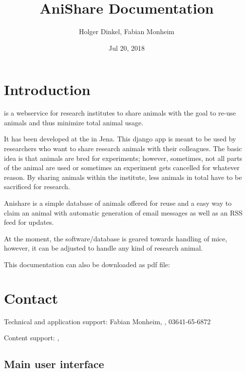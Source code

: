 \documentclass[letterpaper,10pt,openany,oneside,english]{sphinxmanual}
\title{AniShare Documentation}
\date{Jul 20, 2018}
\author{Holger Dinkel, Fabian Monheim}
\begin{document}
\maketitle
\sphinxtableofcontents
{}\label{\detokenize{index::doc}}



\chapter{Introduction}
\label{\detokenize{index:introduction}}
 is a webservice for research institutes to share animals with the goal to re-use
animals and thus minimize total animal usage.

It has been developed at the  in
Jena. This django app is meant to be used by researchers who want to share research animals with
their colleagues. The basic idea is that animals are bred for experiments; however, sometimes, not
all parts of the animal are used or sometimes an experiment gets cancelled for whatever reason. By
sharing animals within the institute, less animals in total have to be sacrificed for research.

Anishare is a simple database of animals offered for reuse and a easy way to claim an animal with
automatic generation of email messages as well as an RSS feed for updates.

\noindent{}

At the moment, the software/database is geared towards handling of mice, however, it can be adjusted
to handle any kind of research animal.

This documentation can also be downloaded as pdf file: 


\chapter{Contact}
\label{\detokenize{index:contact}}
Technical and application support: Fabian Monheim, , 03641-65-6872

Content support: , 


\section{Main user interface}
\label{\detokenize{index:main-user-interface}}
\end{document}
